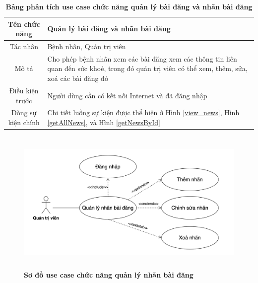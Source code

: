   \begin{table}[H]
    \caption{\bfseries \fontsize{12pt}{0pt}\selectfont Bảng phân tích use case chức năng quản lý bài đăng và nhãn bài đăng}
    \centering
    \begin{tabularx}{0.9\textwidth}{|c|X|}
      \hline
      \textbf{Tên chức năng} & \textbf{Quản lý bài đăng và nhãn bài đăng} \\
      \hline
      Tác nhân & Bệnh nhân, Quản trị viên \\
      \hline
      Mô tả & Cho phép bệnh nhân xem các bài đăng xem các thông tin liên quan đến sức khoẻ, trong đó quản trị viên có thể
      xem, thêm, sửa, xoá các bài đăng đó  \\
      \hline
      Điều kiện trước & Người dùng cần có kết nối Internet và đã đăng nhập \\
      \hline
      Dòng sự kiện chính & 
        Chi tiết luồng sự kiện được thể hiện ở Hình \ref{view_news}, Hình \ref{getAllNews},
        và Hình \ref{getNewsById} \\
      \hline
    \end{tabularx}
  \end{table}

  \begin{figure}[H]
    \centering
    \includegraphics[width=15cm,height=7cm]{Images/use_case/use_case_category_news.png}
    \caption[Sơ đồ use case chức năng quản lý nhãn bài đăng]{\bfseries \fontsize{12pt}{0pt}
    \selectfont Sơ đồ use case chức năng quản lý nhãn bài đăng}
    \label{use_case_category_news} %
  \end{figure}

